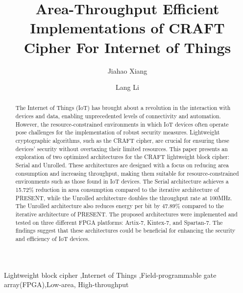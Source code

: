 \documentclass[final,5p,times,twocolumn]{elsarticle}
\begin{document}
\begin{frontmatter}

    \title{Area-Throughput Efficient Implementations of CRAFT Cipher For Internet of Things }

    \author[a,b]{Jiahao Xiang}
    \author[a,b]{Lang Li}







    \begin{abstract}
    The Internet of Things (IoT) has brought about a revolution in the interaction with devices and data, enabling unprecedented levels of connectivity and automation. However, the resource-constrained environments in which IoT devices often operate pose challenges for the implementation of robust security measures. Lightweight cryptographic algorithms, such as the CRAFT cipher, are crucial for ensuring these devices' security without overtaxing their limited resources.
    This paper presents an exploration of two optimized architectures for the CRAFT lightweight block cipher: Serial and Unrolled. These architectures are designed with a focus on reducing area consumption and increasing throughput, making them suitable for resource-constrained environments such as those found in IoT devices. The Serial architecture achieves a 15.72\% reduction in area consumption compared to the iterative architecture of PRESENT, while the Unrolled architecture doubles the throughput rate at 100MHz. The Unrolled architecture also reduces energy per bit by 47.89\% compared to the iterative architecture of PRESENT. 
    The proposed architectures were implemented and tested on three different FPGA platforms: Artix-7, Kintex-7, and Spartan-7. The findings suggest that these architectures could be beneficial for enhancing the security and efficiency of IoT devices.
    \end{abstract}


    \begin{keyword}
        Lightweight block cipher \sep Internet of Things  \sep Field-programmable gate array(FPGA)\sep  Low-area, High-throughput

    \end{keyword}

\end{frontmatter}
\end{document}
